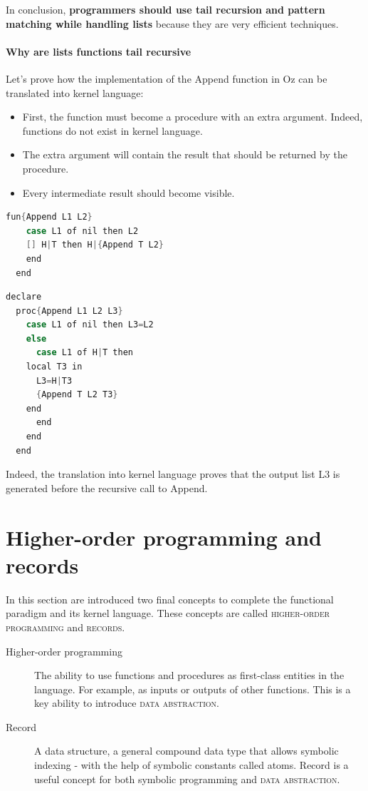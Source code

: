 \documentclass[11pt,a4paper,twoside,openright]{report}
\begin{document}
In conclusion, \textbf{programmers should use tail recursion and pattern 
matching while handling lists} because they are very efficient techniques.

\paragraph{Why are lists functions tail recursive\\}

Let's prove how the implementation of the Append function in Oz can be 
translated into kernel language:

\begin{itemize}
	\item First, the function must become a procedure with an extra 
argument. Indeed, functions do not exist in kernel language.
	\item The extra argument will contain the result that should be 
returned by the procedure.
	\item Every intermediate result should become visible.
\end{itemize}

\begin{lstlisting}[language=Java,frame=single]
  fun{Append L1 L2}
    case L1 of nil then L2
    [] H|T then H|{Append T L2}
    end
  end
\end{lstlisting}

\begin{lstlisting}[language=Java,frame=single]
  declare
  proc{Append L1 L2 L3}
    case L1 of nil then L3=L2
    else 
      case L1 of H|T then
	local T3 in 
	  L3=H|T3
	  {Append T L2 T3}
	end
      end
    end
  end
\end{lstlisting}

Indeed, the translation into kernel language proves that the output list L3 is 
generated before the recursive call to Append.

\section{Higher-order programming and records}

In this section are introduced two final concepts to complete the functional 
paradigm and its kernel language. These concepts are called 
\textsc{higher-order 
programming} and \textsc{records}.

\begin{description}
 \item[Higher-order programming] The ability to use functions and procedures as 
first-class entities in the language. For example, as inputs or outputs of 
other 
functions. This is a key ability to introduce \textsc{data abstraction}.
 \item[Record] A data structure, a general compound data type that allows 
symbolic indexing - with the help of symbolic constants called atoms. Record is 
a useful concept for both symbolic programming and \textsc{data abstraction}.
\end{description}
\end{document}
